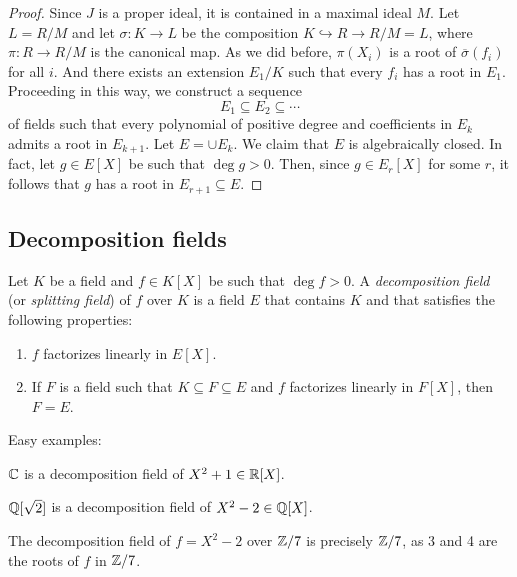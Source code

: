 \begin{proof}
    Since $J$ is a proper ideal, it is contained in a maximal ideal $M$. Let $L=R/M$ 
    and let $\sigma\colon K\to L$ be the composition $K\hookrightarrow R\to R/M=L$, 
    where $\pi\colon R\to R/M$ is the canonical map.  
    As we did before,
    $\pi(X_i)$ is a root of $\overline{\sigma}(f_i)$ for all $i$. And 
    there exists an extension $E_1/K$ such that
    every $f_i$ has a root in $E_1$. Proceeding in this way, we construct
    a sequence
    \[
    E_1\subseteq E_2\subseteq\cdots
    \]
    of fields such that every polynomial of positive degree and coefficients in $E_k$ 
    admits a root in $E_{k+1}$. Let $E=\cup E_k$. We claim that $E$ is algebraically closed. In fact, 
    let $g\in E[X]$ be such that $\deg g>0$. Then, since $g\in E_r[X]$ for some $r$, it follows
    that $g$ has a root in $E_{r+1}\subseteq E$. 
\end{proof}

\subsection{Decomposition fields}


\begin{definition}
\label{def:splitting_field}
\label{def:decomposition_field}
	Let $K$ be a field and $f\in K[X]$ be such that $\deg f>0$. A \emph{decomposition field} (or \emph{splitting field}) 
	of $f$ over $K$ is a field $E$ that contains $K$ and that satisfies the following properties:
	\begin{enumerate}
		\item $f$ factorizes linearly in $E[X]$. 
		\item If $F$ is a field such that $K\subseteq F\subseteq E$ and 
			$f$ factorizes
			linearly in $F[X]$, then $F=E$. 
	\end{enumerate}
\end{definition}

Easy examples: 

\begin{example}
	$\mathbb{C}$ is a decomposition field of $X^2+1\in\mathbb{R}[X]$. 
\end{example}

\begin{example}
	$\mathbb{Q}[\sqrt{2}]$ is a decomposition field of $X^2-2\in\mathbb{Q}[X]$. 
\end{example}

\begin{example}
    The decomposition field of $f=X^2-2$ over $\mathbb{Z}/7$ is 
    precisely $\mathbb{Z}/7$, as 3 and 4 are the roots of $f$ in $\mathbb{Z}/7$. 
\end{example}

